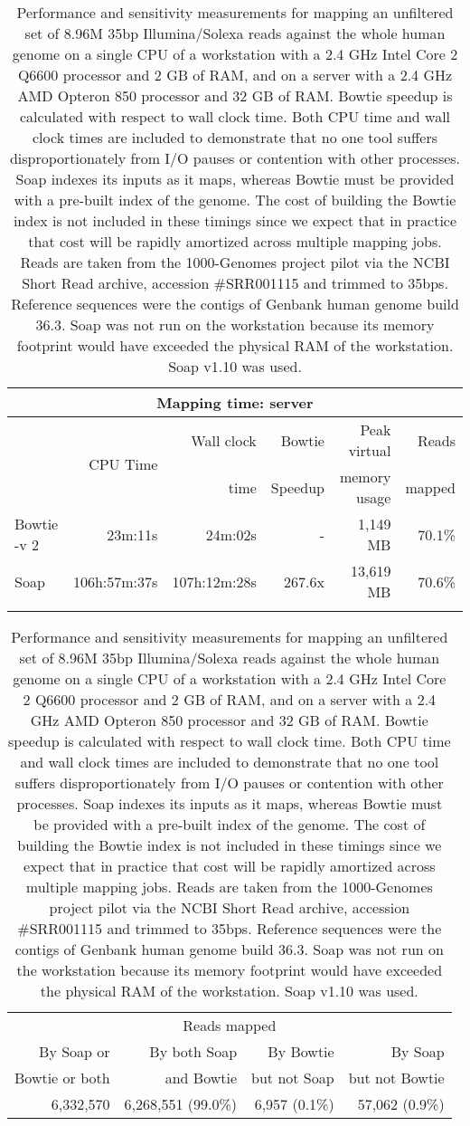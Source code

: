 \documentclass[letterpaper]{article}
\begin{document}
\begin{table}[tp]
\scriptsize
\begin{tabular}{lrrrrr}
\multicolumn{6}{c}{\small{Mapping time: server}} \\[3pt]
\toprule
 & \multirow{2}{*}{CPU Time} & Wall clock & Bowtie  & Peak virtual & Reads  \\
 &                            & time       & Speedup & memory usage & mapped \\[3pt]
\toprule
Bowtie -v 2 & 23m:11s & 24m:02s & - & 1,149 MB & 70.1\%\\\midrule
Soap & 106h:57m:37s & 107h:12m:28s & 267.6x & 13,619 MB & 70.6\%\\
\bottomrule\\[1pt]
\end{tabular}
\begin{tabular}{rrrr}
\multicolumn{4}{c}{\small{Reads mapped}} \\[3pt] 
By Soap or     & By both Soap & By Bowtie    & By Soap         \\ 
Bowtie or both & and Bowtie   & but not Soap & but not Bowtie \\ 
\toprule
6,332,570 & 6,268,551 (99.0\%) & 6,957 (0.1\%) & 57,062 (0.9\%) \\ 
\bottomrule
\end{tabular}
\caption{Performance and sensitivity measurements for mapping an unfiltered
set of 8.96M 35bp Illumina/Solexa reads
against the whole human genome on a single CPU of a workstation with a 2.4 GHz
Intel Core 2 Q6600 processor and 2 GB of RAM, and on a server with a 2.4 GHz
AMD Opteron 850 processor and 32 GB of RAM. Bowtie speedup is calculated with
respect to wall clock time. Both CPU time and wall clock times are included to
demonstrate that no one tool suffers disproportionately from I/O pauses or
contention with other processes. Soap indexes its inputs
as it maps, whereas Bowtie must be provided with a pre-built index of the
genome.  The cost of building the Bowtie index is not included in these timings
since we expect that in practice that cost will be rapidly amortized across
multiple mapping jobs. Reads are taken from the 1000-Genomes project pilot via
the NCBI Short Read archive, accession \#SRR001115 and trimmed to 35bps.
Reference sequences were the contigs of Genbank human genome build 36.3. Soap
was not run on the workstation because its memory footprint would have exceeded
the physical RAM of the workstation. Soap v1.10 was used. }
\end{table}
\end{document}
